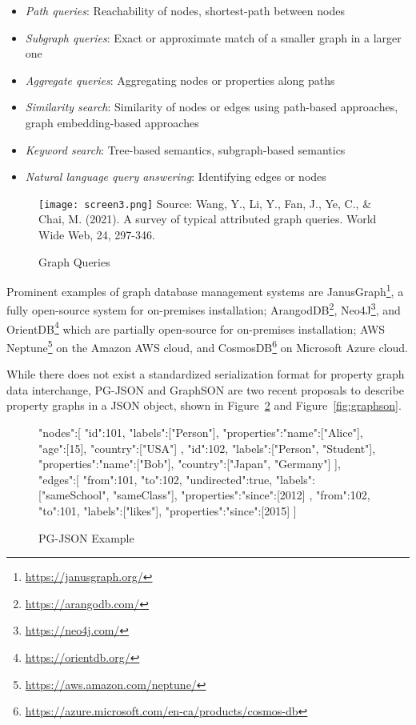 \begin{itemize}
	\item \emph{Path queries}: Reachability of nodes, shortest-path between nodes
	\item \emph{Subgraph queries}: Exact or approximate match of a smaller graph in a larger one
	\item \emph{Aggregate queries}: Aggregating nodes or properties along paths
	\item \emph{Similarity search}: Similarity of nodes or edges using path-based approaches, graph embedding-based approaches
	\item \emph{Keyword search}: Tree-based semantics, subgraph-based semantics
	\item \emph{Natural language query answering}: Identifying edges or nodes
\end{itemize}

\begin{figure}
\texttt{[image: screen3.png]}
\scriptsize
Source: Wang, Y., Li, Y., Fan, J., Ye, C., \& Chai, M. (2021). A survey of typical attributed graph queries. World Wide Web, 24, 297-346.
\caption{Graph Queries}
\label{fig:graphqueries}
\end{figure}

Prominent examples of graph database management systems are JanusGraph\footnote{\url{https://janusgraph.org/}}, a fully open-source system for on-premises installation; ArangodDB\footnote{\url{https://arangodb.com/}}, Neo4J\footnote{\url{https://neo4j.com/}}, and OrientDB\footnote{\url{https://orientdb.org/}} which are partially open-source for on-premises installation; AWS Neptune\footnote{\url{https://aws.amazon.com/neptune/}} on the Amazon AWS cloud, and CosmosDB\footnote{\url{https://azure.microsoft.com/en-ca/products/cosmos-db}} on Microsoft Azure cloud. 

While there does not exist a standardized serialization format for property graph data interchange, PG-JSON and GraphSON are two recent proposals to describe property graphs in a JSON object, shown in Figure~\ref{fig:pgjson} and Figure~\ref{fig:graphson}.

\begin{figure}[h]
\begin{jsoncode}
{
  "nodes":[
    {
     "id":101,
     "labels":["Person"],
     "properties":{"name":["Alice"], "age":[15], "country":["USA"]}
    },
    {
     "id":102,
     "labels":["Person", "Student"],
     "properties":{"name":["Bob"], "country":["Japan", "Germany"]}
    }
  ],
  "edges":[
    {
     "from":101,
     "to":102,
     "undirected":true,
     "labels":["sameSchool", "sameClass"],
     "properties":{"since":[2012]}
    },
    {
     "from":102,
     "to":101,
     "labels":["likes"],
     "properties":{"since":[2015]}
    }
  ]
}
\end{jsoncode}

\caption{PG-JSON Example}
\label{fig:pgjson}

\end{figure}

